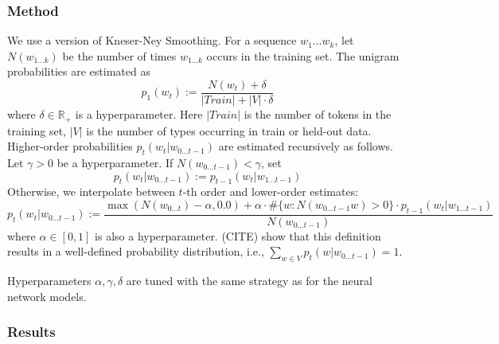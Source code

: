 
\subsubsection{Method}
We use a version of Kneser-Ney Smoothing.
For a sequence $w_1\dots w_k$, let $N(w_{1\dots k})$ be the number of times $w_{1\dots k}$ occurs in the training set.
The unigram probabilities are estimated as
\begin{equation}
	p_1(w_t) :=   \frac{N(w_t) + \delta}{|Train| + |V| \cdot \delta}
\end{equation}
where $\delta \in \mathbb{R}_+$ is a hyperparameter.
Here $|Train|$ is the number of tokens in the training set, $|V|$ is the number of types occurring in train or held-out data.
Higher-order probabilities $p_t(w_t|w_{0 \dots t-1})$ are estimated recursively as follows.
Let $\gamma > 0$ be a hyperparameter.
If $N(w_{0 \dots t-1}) < \gamma$, set
\begin{equation}
	p_t(w_t|w_{0 \dots t-1}) := p_{t-1}(w_t|w_{1\dots t-1})
\end{equation}
Otherwise, we interpolate between $t$-th order and lower-order estimates:
\begin{equation}
	p_t(w_t|w_{0 \dots t-1}) :=  \frac{\operatorname{max}(N(w_{0\dots t}) - \alpha, 0.0) + \alpha \cdot \#\{w : N(w_{0 \dots t-1}w) > 0\} \cdot p_{t-1}(w_t|w_{1\dots t-1})}{N(w_{0\dots t-1})}
\end{equation}
where $\alpha \in [0,1]$ is also a hyperparameter.
(CITE) show that this definition results in a well-defined probability distribution, i.e., $\sum_{w \in V} p_t(w|w_{0 \dots t-1}) = 1$.

%
%
%
%


Hyperparameters $\alpha, \gamma, \delta$ are tuned with the same strategy as for the neural network models.


\subsubsection{Results}



